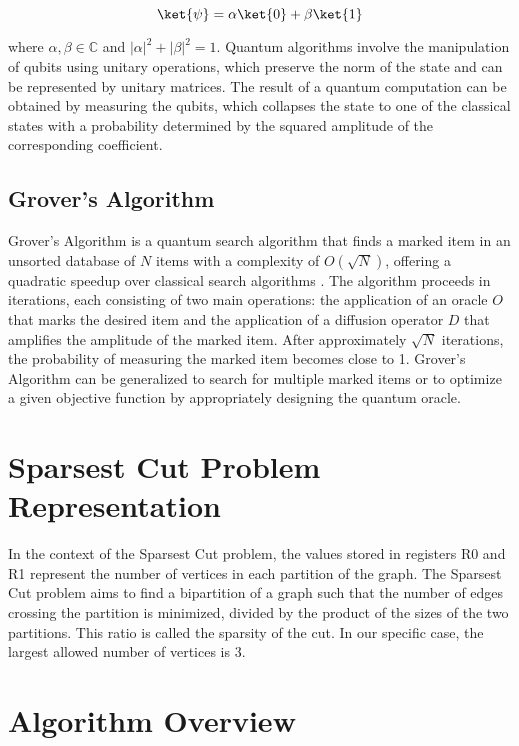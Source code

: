 \begin{equation}
\ket{\psi} = \alpha \ket{0} + \beta \ket{1}
\end{equation}

where $\alpha, \beta \in \mathbb{C}$ and $|\alpha|^2 + |\beta|^2 = 1$. Quantum algorithms involve the manipulation of qubits using unitary operations, which preserve the norm of the state and can be represented by unitary matrices. The result of a quantum computation can be obtained by measuring the qubits, which collapses the state to one of the classical states with a probability determined by the squared amplitude of the corresponding coefficient.

\subsection{Grover's Algorithm}

Grover's Algorithm is a quantum search algorithm that finds a marked item in an unsorted database of $N$ items with a complexity of $O(\sqrt{N})$, offering a quadratic speedup over classical search algorithms \cite{grover1996fast}. The algorithm proceeds in iterations, each consisting of two main operations: the application of an oracle $O$ that marks the desired item and the application of a diffusion operator $D$ that amplifies the amplitude of the marked item. After approximately $\sqrt{N}$ iterations, the probability of measuring the marked item becomes close to 1. Grover's Algorithm can be generalized to search for multiple marked items or to optimize a given objective function by appropriately designing the quantum oracle.



\section{Sparsest Cut Problem Representation}

In the context of the Sparsest Cut problem, the values stored in registers R0 and R1 represent the number of vertices in each partition of the graph. The Sparsest Cut problem aims to find a bipartition of a graph such that the number of edges crossing the partition is minimized, divided by the product of the sizes of the two partitions. This ratio is called the sparsity of the cut. In our specific case, the largest allowed number of vertices is 3.

\section{Algorithm Overview}

